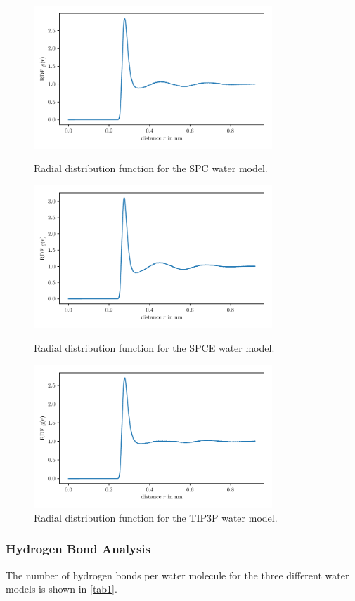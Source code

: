 \documentclass[a4paper,10pt,bibtotoc]{scrartcl}
\begin{document}
\begin{figure}[h]
\centering
 \includegraphics[width=0.8\textwidth]{RDF_SPC.pdf}
 \caption{Radial distribution function for the SPC water model.}
 \label{fig:fig_gromacs_1}
 \includegraphics[width=0.8\textwidth]{RDF_SPCE.pdf}
 \caption{Radial distribution function for the SPCE water model.}
 \label{fig:fig_gromacs_2}
 \includegraphics[width=0.8\textwidth]{RDF_TIP3P.pdf}
 \caption{Radial distribution function for the TIP3P water model.}
 \label{fig:fig_gromacs_3}
\end{figure}

\subsubsection*{Hydrogen Bond Analysis}
The number of hydrogen bonds per water molecule for the three different water models is shown in \autoref{tab1}.
\end{document}
